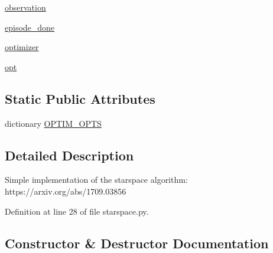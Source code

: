 \begin{DoxyCompactItemize}
\item 
\hyperlink{classparlai_1_1agents_1_1starspace_1_1starspace_1_1StarspaceAgent_a0ec7b24305a7ca5f0fd5a11cd6aa1fdc}{observation}
\item 
\hyperlink{classparlai_1_1agents_1_1starspace_1_1starspace_1_1StarspaceAgent_ad6565ef570b709afb46bf9a9b4bc59c3}{episode\+\_\+done}
\item 
\hyperlink{classparlai_1_1agents_1_1starspace_1_1starspace_1_1StarspaceAgent_afacbbd91785631f9b23fd0fbd9b4cc21}{optimizer}
\item 
\hyperlink{classparlai_1_1agents_1_1starspace_1_1starspace_1_1StarspaceAgent_aae476e9cdd8b9672ae6c28ef9400f09e}{opt}
\end{DoxyCompactItemize}
\subsection*{Static Public Attributes}
\begin{DoxyCompactItemize}
\item 
dictionary \hyperlink{classparlai_1_1agents_1_1starspace_1_1starspace_1_1StarspaceAgent_ab9c156709a8072a6cddf7216396f610a}{O\+P\+T\+I\+M\+\_\+\+O\+P\+TS}
\end{DoxyCompactItemize}


\subsection{Detailed Description}
\begin{DoxyVerb}Simple implementation of the starspace algorithm: https://arxiv.org/abs/1709.03856
\end{DoxyVerb}
 

Definition at line 28 of file starspace.\+py.



\subsection{Constructor \& Destructor Documentation}
\mbox{\label{classparlai_1_1agents_1_1starspace_1_1starspace_1_1StarspaceAgent_a6bdc1142c021946ee6cb409d4f9dc3c9}} 
